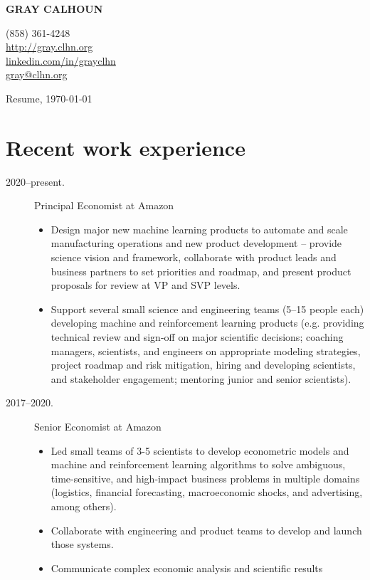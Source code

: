 \documentclass[10pt]{safecv}%
\begin{document}
\MakeUppercase{\textbf{Gray Calhoun}}
\hfill
\parbox[t][0pt]{5cm}{%
\hfill (858) 361-4248 \\
\hfill \url{http://gray.clhn.org}\\
\hfill \href{https://www.linkedin.com/in/grayclhn}{linkedin.com/in/grayclhn} \\
\hfill \url{gray@clhn.org}
}

\vspace{\itemsep}%
Resume, \today

\section*{Recent work experience}

\begin{description}
\item[2020--present.] Principal Economist at Amazon
  \begin{itemize}
  \item Design major new machine learning products to automate and
    scale manufacturing operations and new product development --
    provide science vision and framework, collaborate with product
    leads and business partners to set priorities and roadmap, and
    present product proposals for review at VP and SVP levels.
  \item Support several small science and engineering teams (5--15
    people each) developing machine and reinforcement learning
    products (e.g. providing technical review and sign-off on major
    scientific decisions; coaching managers, scientists, and engineers
    on appropriate modeling strategies, project roadmap and risk
    mitigation, hiring and developing scientists, and stakeholder
    engagement; mentoring junior and senior scientists).
  \end{itemize}
\item[2017--2020.] Senior Economist at Amazon
  \begin{itemize}
  \item Led small teams of 3-5 scientists to develop econometric
    models and machine and reinforcement learning algorithms to solve
    ambiguous, time-sensitive, and high-impact business problems in
    multiple domains (logistics, financial forecasting, macroeconomic
    shocks, and advertising, among others).
  \item Collaborate with engineering and product teams to develop and
    launch those systems.
  \item Communicate complex economic analysis and scientific results

\end{itemize}
\end{description}
\end{document}
